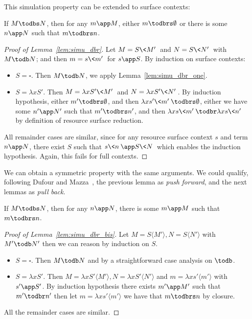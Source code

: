 This simulation property can be extended to surface contexts:
\begin{lemma}
	\label{lem:simu_dbr}
	If $M\todbs N$, then for any $m\app M$, either $m\todbrs \emptyset$ or there is some $n\app N$ such
	that $m\todbrs n$.
\end{lemma}
\begin{proof}[Proof of Lemma~\ref{lem:simu_dbr}]
	Let $M=S\<M'\>$ and $N=S\<N'\>$ with $M\todb N$; and then $m=s\<m'\>$
	for $s\app S$.
	By induction on surface contexts:
	\begin{itemize}
		\item $S=\square$. Then $M\todb N$, we apply
			Lemma~\ref{lem:simu_dbr_one}.
		\item $S=\lambda x S'$. Then $M=\lambda xS'\<M'\>$ and
			$N=\lambda x S'\<N'\>$. By induction hypothesis, either
			$m'\todbrs \emptyset$, and then	$\lambda
			xs'\<m'\>\todbrs \emptyset$, either
			we have some $n'\app N'$ such that $m'\todbrs n'$, and
			then $\lambda xs\<m'\>\todbr \lambda xs\<n'\>$ by
			definition of resource surface reduction.
	\end{itemize}
	All remainder cases are similar, since for any resource surface context
	$s$ and term $n\app N$, there exist $S$ such that $s\<n\>\app
	S\<N\>$ which enables the induction hypothesis. Again, this fails for
	full contexts. 
\end{proof}


We can obtain a symmetric property with the same arguments. We could qualify,
following Dufour and Mazza~\cite{mazza-dufour}, the previous lemma as
\emph{push forward}, and the next lemmas as \emph{pull back}.
\begin{lemma}
	\label{lem:simu_dbr_bis}
	If $M\todbs N$, then for any $n\app N$, there is some $m\app M$ such
	that $m\todbrs n$.
\end{lemma}

\begin{proof}[Proof of Lemma~\ref{lem:simu_dbr_bis}]
	Let $M = S\langle M'\rangle, N = S\langle N'\rangle$ with $M' \todb N'$ then
	we can reason by induction on $S$.
	\begin{itemize}
		\item $S = \square$. Then $M \todb N$ and by a straightforward case
		analysis on $\todb$.
		\item $S = \lambda xS'$. Then $M = \lambda x S'\langle M'\rangle, N =
		\lambda x S'\langle N'\rangle$ and $m = \lambda x s' \langle m' \rangle$
		with $s'\app S'$. By induction hypothesis there exists $m' \app M'$ such
		that $m' \todbr n'$ then let $m = \lambda x s'\langle m'\rangle$ we
		have that $m \todbrs n$ by closure.
	\end{itemize}
	All the remainder cases are similar.
\end{proof}


